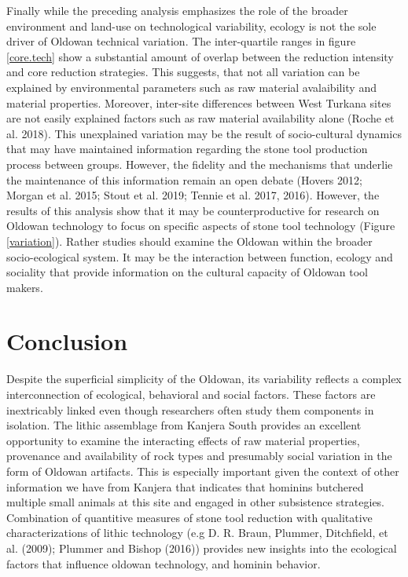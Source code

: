 \documentclass[]{elsarticle} %
\begin{document}
Finally while the preceding analysis emphasizes the role of the broader
environment and land-use on technological variability, ecology is not
the sole driver of Oldowan technical variation. The inter-quartile
ranges in figure \ref{core.tech} show a substantial amount of overlap
between the reduction intensity and core reduction strategies. This
suggests, that not all variation can be explained by environmental
parameters such as raw material avalaibility and material properties.
Moreover, inter-site differences between West Turkana sites are not
easily explained factors such as raw material availability alone (Roche
et al. 2018). This unexplained variation may be the result of
socio-cultural dynamics that may have maintained information regarding
the stone tool production process between groups. However, the fidelity
and the mechanisms that underlie the maintenance of this information
remain an open debate (Hovers 2012; Morgan et al. 2015; Stout et al.
2019; Tennie et al. 2017, 2016). However, the results of this analysis
show that it may be counterproductive for research on Oldowan technology
to focus on specific aspects of stone tool technology (Figure
\ref{variation}). Rather studies should examine the Oldowan within the
broader socio-ecological system. It may be the interaction between
function, ecology and sociality that provide information on the cultural
capacity of Oldowan tool makers.

\hypertarget{conclusion}{%
\section{Conclusion}\label{conclusion}}

Despite the superficial simplicity of the Oldowan, its variability
reflects a complex interconnection of ecological, behavioral and social
factors. These factors are inextricably linked even though researchers
often study them components in isolation. The lithic assemblage from
Kanjera South provides an excellent opportunity to examine the
interacting effects of raw material properties, provenance and
availability of rock types and presumably social variation in the form
of Oldowan artifacts. This is especially important given the context of
other information we have from Kanjera that indicates that hominins
butchered multiple small animals at this site and engaged in other
subsistence strategies. Combination of quantitive measures of stone tool
reduction with qualitative characterizations of lithic technology (e.g
D. R. Braun, Plummer, Ditchfield, et al. (2009); Plummer and Bishop
(2016)) provides new insights into the ecological factors that influence
oldowan technology, and hominin behavior.
\end{document}
